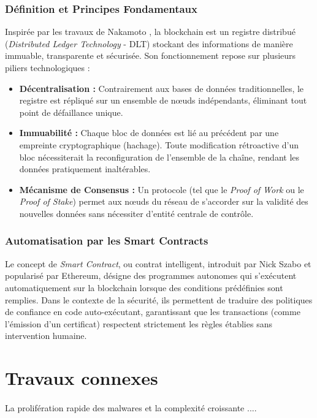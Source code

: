 \documentclass[12pt]{report}
\begin{document}
\begin{itemize}
\subsubsection{Définition et Principes Fondamentaux}
Inspirée par les travaux de Nakamoto \cite{nakamoto2008bitcoin}, la blockchain est un registre distribué (\textit{Distributed Ledger Technology} - DLT) stockant des informations de manière immuable, transparente et sécurisée. Son fonctionnement repose sur plusieurs piliers technologiques :
\begin{itemize}
    \item \textbf{Décentralisation :} Contrairement aux bases de données traditionnelles, le registre est répliqué sur un ensemble de nœuds indépendants, éliminant tout point de défaillance unique.
    \item \textbf{Immuabilité :} Chaque bloc de données est lié au précédent par une empreinte cryptographique (hachage). Toute modification rétroactive d'un bloc nécessiterait la reconfiguration de l'ensemble de la chaîne, rendant les données pratiquement inaltérables.
    \item \textbf{Mécanisme de Consensus :} Un protocole (tel que le \textit{Proof of Work} ou le \textit{Proof of Stake}) permet aux nœuds du réseau de s'accorder sur la validité des nouvelles données sans nécessiter d'entité centrale de contrôle.
\end{itemize}

\subsubsection{Automatisation par les Smart Contracts}
Le concept de \textit{Smart Contract}, ou contrat intelligent, introduit par Nick Szabo et popularisé par Ethereum, désigne des programmes autonomes qui s'exécutent automatiquement sur la blockchain lorsque des conditions prédéfinies sont remplies. Dans le contexte de la sécurité, ils permettent de traduire des politiques de confiance en code auto-exécutant, garantissant que les transactions (comme l'émission d'un certificat) respectent strictement les règles établies sans intervention humaine.



\section{Travaux connexes}

\paragraph{}La prolifération rapide des malwares et la complexité croissante ....


\end{itemize}
\end{document}
